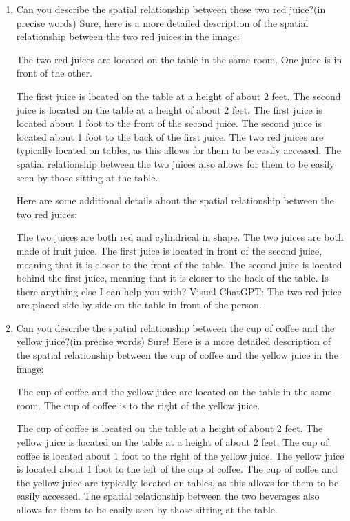 \begin{enumerate}
    \item Can you describe the spatial relationship between these two red juice?(in precise words)
    \subitem Sure, here is a more detailed description of the spatial relationship between the two red juices in the image:

    The two red juices are located on the table in the same room. One juice is in front of the other.
    
    The first juice is located on the table at a height of about 2 feet.
    The second juice is located on the table at a height of about 2 feet.
    The first juice is located about 1 foot to the front of the second juice.
    The second juice is located about 1 foot to the back of the first juice.
    The two red juices are typically located on tables, as this allows for them to be easily accessed. The spatial relationship between the two juices also allows for them to be easily seen by those sitting at the table.
    
    Here are some additional details about the spatial relationship between the two red juices:
    
    The two juices are both red and cylindrical in shape.
    The two juices are both made of fruit juice.
    The first juice is located in front of the second juice, meaning that it is closer to the front of the table.
    The second juice is located behind the first juice, meaning that it is closer to the back of the table.
    Is there anything else I can help you with?
    \subitem Visual ChatGPT: The two red juice are placed side by side on the table in front of the person.
    \item Can you describe the spatial relationship between the cup of coffee and the yellow juice?(in precise words)
    \subitem 
    Sure! Here is a more detailed description of the spatial relationship between the cup of coffee and the yellow juice in the image:
    
    The cup of coffee and the yellow juice are located on the table in the same room. The cup of coffee is to the right of the yellow juice.
    
    The cup of coffee is located on the table at a height of about 2 feet.
    The yellow juice is located on the table at a height of about 2 feet.
    The cup of coffee is located about 1 foot to the right of the yellow juice.
    The yellow juice is located about 1 foot to the left of the cup of coffee.
    The cup of coffee and the yellow juice are typically located on tables, as this allows for them to be easily accessed. The spatial relationship between the two beverages also allows for them to be easily seen by those sitting at the table.
    

\end{enumerate}
